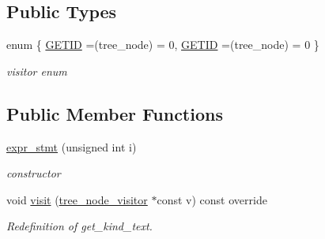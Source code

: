 \subsection*{Public Types}
\begin{DoxyCompactItemize}
\item 
enum \{ \hyperlink{structexpr__stmt_a2cf275af9f5cbba5db5011aaf2a0a9d0a8050d5af094395c15a91cd3b056467de}{G\+E\+T\+ID} =(tree\+\_\+node) = 0, 
\hyperlink{structexpr__stmt_a2cf275af9f5cbba5db5011aaf2a0a9d0a8050d5af094395c15a91cd3b056467de}{G\+E\+T\+ID} =(tree\+\_\+node) = 0
 \}\begin{DoxyCompactList}\small\item\em visitor enum \end{DoxyCompactList}
\end{DoxyCompactItemize}
\subsection*{Public Member Functions}
\begin{DoxyCompactItemize}
\item 
\hyperlink{structexpr__stmt_ab2c288af7109486112aa93aab83f4e90}{expr\+\_\+stmt} (unsigned int i)
\begin{DoxyCompactList}\small\item\em constructor \end{DoxyCompactList}\item 
void \hyperlink{structexpr__stmt_a2d0ca76e32e1bdf477e4f033fa6c8f92}{visit} (\hyperlink{classtree__node__visitor}{tree\+\_\+node\+\_\+visitor} $\ast$const v) const override
\begin{DoxyCompactList}\small\item\em Redefinition of get\+\_\+kind\+\_\+text. \end{DoxyCompactList}\end{DoxyCompactItemize}
